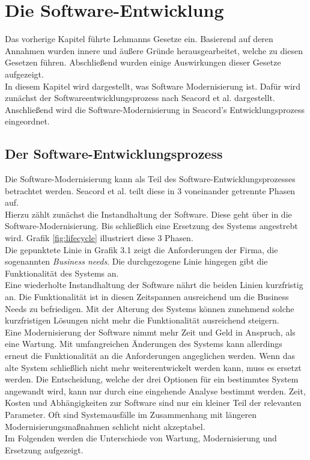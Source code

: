 \chapter{Die Software-Entwicklung}
\label{chapter3}
Das vorherige Kapitel führte Lehmanns Gesetze ein. Basierend auf deren Annahmen wurden innere und äußere Gründe herausgearbeitet, welche zu diesen Gesetzen führen. Abschließend wurden einige Auswirkungen dieser Gesetze aufgezeigt.\\
In diesem Kapitel wird dargestellt, was Software Modernisierung ist. Dafür wird zunächst der Softwareentwicklungsprozess nach Seacord et al. dargestellt. Anschließend wird die Software-Modernisierung in Seacord’s Entwicklungsprozess  eingeordnet.

\section{Der Software-Entwicklungsprozess}
Die Software-Modernisierung kann als Teil des Software-Entwicklungsprozesses betrachtet werden. 
Seacord et al. \cite{seacord_modernizing_2003} teilt diese in 3 voneinander getrennte Phasen auf.\\
Hierzu zählt zunächst die Instandhaltung der Software. Diese geht über in die Software-Modernisierung. Bis schließlich eine Ersetzung des Systems angestrebt wird. Grafik \ref{fig:lifecycle} illustriert diese 3 Phasen.\\
Die gepunktete Linie in Grafik 3.1 zeigt die Anforderungen der Firma, die sogenannten \textit{Business needs}. Die durchgezogene Linie hingegen gibt die Funktionalität des Systems an.\\
Eine wiederholte Instandhaltung der Software nährt die beiden Linien kurzfristig an. Die Funktionalität ist in diesen Zeitspannen ausreichend um die Business Needs zu befriedigen. 
Mit der Alterung des Systems können zunehmend solche kurzfristigen Lösungen nicht mehr die Funktionalität ausreichend steigern. \\
Eine Modernisierung der Software nimmt mehr Zeit und Geld in Anspruch, als eine Wartung. Mit umfangreichen Änderungen des Systems kann allerdings erneut die Funktionalität an die Anforderungen angeglichen werden. 
Wenn das alte System schließlich nicht mehr weiterentwickelt werden kann, muss es ersetzt werden. 
Die Entscheidung, welche der drei Optionen für ein bestimmtes System angewandt wird, kann nur durch eine eingehende Analyse bestimmt werden. Zeit, Kosten und Abhängigkeiten zur Software sind nur ein kleiner Teil der relevanten Parameter. Oft sind Systemausfälle im Zusammenhang mit längeren Modernisierungsmaßnahmen schlicht nicht akzeptabel. \cite{seacord_modernizing_2003} \\
Im Folgenden werden die Unterschiede von Wartung, Modernisierung und Ersetzung aufgezeigt. 


